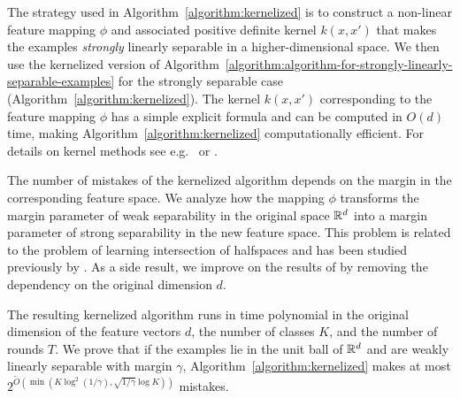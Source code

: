 The strategy used in Algorithm~\ref{algorithm:kernelized} is to construct a
non-linear feature mapping $\phi$ and associated positive definite kernel
$k(x,x')$ that makes the examples \emph{strongly} linearly separable in a higher-dimensional space.
We then use the kernelized version of
Algorithm~\ref{algorithm:algorithm-for-strongly-linearly-separable-examples} for
the strongly separable case (Algorithm~\ref{algorithm:kernelized}). The kernel
$k(x,x')$ corresponding to the feature mapping $\phi$ has a simple explicit
formula and can be computed in $O(d)$ time, making
Algorithm~\ref{algorithm:kernelized} computationally efficient. For details on
kernel methods see e.g.~\citet{Scholkopf-Smola-2002} or
\citet{Shawe-Taylor-Cristianini-2004}.

The number of mistakes of the kernelized algorithm depends on the margin in the
corresponding feature space. We analyze how the mapping $\phi$ transforms the
margin parameter of weak separability in the original space $\mathbb{R}^d$ into a margin
parameter of strong separability in the new feature space. This problem is
related to the problem of learning intersection of halfspaces and has been
studied previously by \citet{Klivans-Servedio-2008}. As a side result, we
improve on the results of \citet{Klivans-Servedio-2008} by removing the
dependency on the original dimension $d$.

The resulting kernelized algorithm runs in time polynomial in the
original dimension of the feature vectors $d$, the number of classes $K$, and
the number of rounds $T$. We prove that if the examples lie in the unit ball of
$\mathbb{R}^d$ and are weakly linearly separable with margin $\gamma$,
Algorithm~\ref{algorithm:kernelized} makes at
most $2^{\widetilde{O}(\min(K \log^2 (1/\gamma), \sqrt{1/\gamma}
\log K))}$ mistakes.
